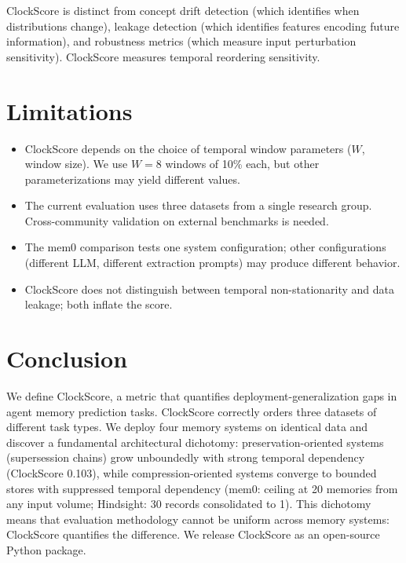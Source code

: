 \documentclass[sigconf,nonacm]{acmart}
\begin{document}
ClockScore is distinct from concept drift detection (which identifies when distributions change), leakage detection (which identifies features encoding future information), and robustness metrics (which measure input perturbation sensitivity). ClockScore measures temporal reordering sensitivity.

\section{Limitations}

\begin{itemize}
\item ClockScore depends on the choice of temporal window parameters ($W$, window size). We use $W = 8$ windows of 10\% each, but other parameterizations may yield different values.
\item The current evaluation uses three datasets from a single research group. Cross-community validation on external benchmarks is needed.
\item The mem0 comparison tests one system configuration; other configurations (different LLM, different extraction prompts) may produce different behavior.
\item ClockScore does not distinguish between temporal non-stationarity and data leakage; both inflate the score.
\end{itemize}

\section{Conclusion}
We define ClockScore, a metric that quantifies deployment-generalization gaps in agent memory prediction tasks. ClockScore correctly orders three datasets of different task types. We deploy four memory systems on identical data and discover a fundamental architectural dichotomy: preservation-oriented systems (supersession chains) grow unboundedly with strong temporal dependency (ClockScore 0.103), while compression-oriented systems converge to bounded stores with suppressed temporal dependency (mem0: ceiling at 20 memories from any input volume; Hindsight: 30 records consolidated to 1). This dichotomy means that evaluation methodology cannot be uniform across memory systems: ClockScore quantifies the difference. We release ClockScore as an open-source Python package.
\end{document}
